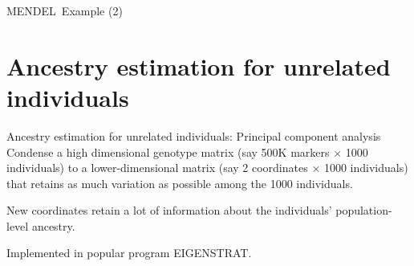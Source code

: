 \documentclass[serif,professionalfonts,svgnames]{beamer}
\newcommand{\eigenstrat}{\textsc{EIGENSTRAT}}
\newcommand{\mendel}{\textsc{MENDEL}}
\begin{document}
\begin{frame}[containsverbatim]{\mendel\ Example (2)}
\end{frame}





\section{Ancestry estimation for unrelated individuals}

\begin{frame}{Ancestry estimation for unrelated individuals: Principal component analysis}
  Condense a high dimensional genotype matrix (say 500K markers
  $\times$ 1000 individuals) to a lower-dimensional matrix (say 2
  coordinates $\times$ 1000 individuals) that retains as much
  variation as possible among the 1000 individuals.

  New coordinates retain a lot of information about the individuals'
  population-level ancestry.
  
  Implemented in popular program \eigenstrat.
\end{frame}
\end{document}
